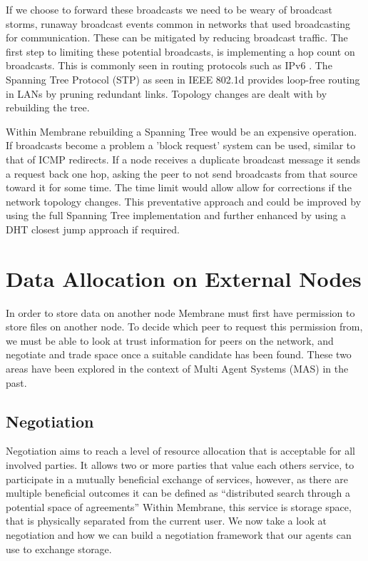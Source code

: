 \documentclass[11pt, a4paper, twoside]{report}
\begin{document}
If we choose to forward these broadcasts we need to be weary of broadcast storms, runaway broadcast events common in networks that used broadcasting for communication. \citep{Tseng:2002:BSP:506900.506905} These can be mitigated by reducing broadcast traffic. The first step to limiting these potential broadcasts, is implementing a hop count on broadcasts. This is commonly seen in routing protocols such as IPv6 \citep{deering1998internet}. The Spanning Tree Protocol (STP) as seen in IEEE 802.1d \citep*{ieee802ieee, sharma2004viking} provides loop-free routing in LANs by pruning redundant links. Topology changes are dealt with by rebuilding the tree.

Within Membrane rebuilding a Spanning Tree would be an expensive operation. If broadcasts become a problem a 'block request' system can be used, similar to that of ICMP redirects. \citep{postel1981rfc} If a node receives a duplicate broadcast message it sends a request back one hop, asking the peer to not send broadcasts from that source toward it for  some time. The time limit would allow allow for corrections if the network topology changes. This preventative approach and could be improved by using the full Spanning Tree implementation and further enhanced by using a DHT closest jump approach if required.

\section{Data Allocation on External Nodes}

In order to store data on another node Membrane must first have permission to store files on another node. To decide which peer to request this permission from, we must be able to look at trust information for peers on the network, and negotiate and trade space once a suitable candidate has been found. These two areas have been explored in the context of Multi Agent Systems (MAS) in the past. \citep{wooldridge2009introduction}

\subsection{Negotiation} \label{sec:neg}

Negotiation aims to reach a level of resource allocation that is acceptable for all involved parties. \citep{rahwan2005interest} It allows two or more parties that value each others service, to participate in a mutually beneficial exchange of services, however, as there are multiple beneficial outcomes it can be defined as ``distributed search through a potential space of agreements'' \citep{jennings2001automated} Within Membrane, this service is storage space, that is physically separated from the current user. We now take a look at negotiation and how we can build a negotiation framework that our agents can use to exchange storage.
\end{document}

